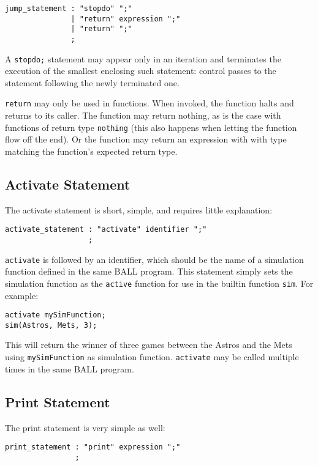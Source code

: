 \begin{verbatim}
jump_statement : "stopdo" ";"
               | "return" expression ";"
               | "return" ";"
               ;
\end{verbatim}

A \texttt{stopdo;} statement may appear only in an iteration and
terminates the execution of the smallest enclosing such statement:
control passes to the statement following the newly terminated one.

\texttt{return} may only be used in functions. When invoked, the
function halts and returns to its caller. The function may return
nothing, as is the case with functions of return type \texttt{nothing}
(this also happens when letting the function flow off the end). Or the
function may return an expression with with type matching the
function's expected return type.

\subsection{Activate Statement}\label{activateStmt}
The activate statement is short, simple, and requires little explanation:

\begin{verbatim}
activate_statement : "activate" identifier ";"
                   ;
\end{verbatim}

\texttt{activate} is followed by an identifier, which should be the name of a
simulation function defined in the same BALL program. This statement
simply sets the simulation function as the \texttt{active} function for use
in the builtin function \texttt{sim}. For example:

\begin{verbatim}
activate mySimFunction;
sim(Astros, Mets, 3);
\end{verbatim}

This will return the winner of three games between the Astros and the
Mets using \texttt{mySimFunction} as simulation
function. \texttt{activate} may be called multiple times in the same
BALL program.

\subsection{Print Statement}

The print statement is very simple as well: 

\begin{verbatim}
print_statement : "print" expression ";"
                ;
\end{verbatim}

